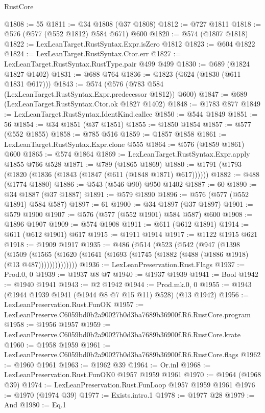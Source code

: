 \begin{lexlean}{RustCore}
\begin{coremodule}
@1808 := 55
@1811 := @34 @1808 (@37 @1808)
@1812 := @727 @1811
@1818 := @576 (@577 (@552 @1812) @584 @671) @600
@1820 := @574 (@1807 @1818)
@1822 := LexLeanTarget.RustSyntax.Expr.isZero @1812
@1823 := @604 @1822
@1824 := LexLeanTarget.RustSyntax.Ctor.err
@1827 := LexLeanTarget.RustSyntax.RustType.pair @499 @499
@1830 := @689 (@1824 @1827 @1402)
@1831 := @688 @764
@1836 := @1823 (@624 (@1830 (@611 @1831 @617)))
@1843 := @574 (@576 (@783 @584 (LexLeanTarget.RustSyntax.Expr.predecessor @1812)) @600)
@1847 := @689 (LexLeanTarget.RustSyntax.Ctor.ok @1827 @1402)
@1848 := @1783 @877
@1849 := LexLeanTarget.RustSyntax.IdentKind.callee
@1850 := @544 @1849
@1851 := 56
@1854 := @34 @1851 (@37 @1851)
@1855 := @1850 @1854
@1857 := @577 (@552 @1855)
@1858 := @785 @516
@1859 := @1857 @1858
@1861 := LexLeanTarget.RustSyntax.Expr.clone @555
@1864 := @576 (@1859 @1861) @600
@1865 := @574 @1864
@1869 := LexLeanTarget.RustSyntax.Expr.apply @1855 @766 @528
@1871 := @789 (@1865 @1869)
@1880 := @1791 (@1793 (@1820 (@1836 (@1843 (@1847 (@611 (@1848 @1871) @617))))))
@1882 := @488 (@1774 @1880)
@1886 := @543 (@546 @90) @950 @1402
@1887 := 60
@1890 := @34 @1887 (@37 @1887)
@1891 := @579 @1890
@1896 := @576 (@577 (@552 @1891) @584 @587)
@1897 := 61
@1900 := @34 @1897 (@37 @1897)
@1901 := @579 @1900
@1907 := @576 (@577 (@552 @1901) @584 @587) @600
@1908 := @1896 @1907
@1909 := @574 @1908
@1911 := @611 (@612 @1891)
@1914 := @611 (@612 @1901) @617
@1915 := @1911 @1914
@1917 := @1122 @1915 @621
@1918 := @1909 @1917
@1935 := @486
    (@514
      (@523
        (@542
          (@947
            (@1398
              (@1509
                (@1565
                  (@1620 (@1641 (@1693 (@1745 (@1882 (@488 (@1886 @1918) (@13 @487))))))))))))))
@1936 := LexLeanPreservation.Rust.Flags
@1937 := Prod.{0, 0}
@1939 := @1937 @8 @7
@1940 := @1937 @1939
@1941 := Bool
@1942 := @1940 @1941
@1943 := @2 @1942
@1944 := Prod.mk.{0, 0}
@1955 := @1943 (@1944 @1939 @1941 (@1944 @8 @7 @15 @11) @528) (@13 @1942)
@1956 := LexLeanPreservation.Rust.FunOK
@1957 := LexLeanPreserve.C6059bd0b2a90027b0d3ba7689b36900f.R6.RustCore.program
@1958 := @1956 @1957
@1959 := LexLeanPreserve.C6059bd0b2a90027b0d3ba7689b36900f.R6.RustCore.krate
@1960 := @1958 @1959
@1961 := LexLeanPreserve.C6059bd0b2a90027b0d3ba7689b36900f.R6.RustCore.flags
@1962 := @1960 @1961
@1963 := @1962 @39
@1964 := Or.inl
@1968 := LexLeanPreservation.Rust.FunOK0 @1957 @1959 @1961
@1970 := @1964 (@1968 @39)
@1974 := LexLeanPreservation.Rust.FunLoop @1957 @1959 @1961
@1976 := @1970 (@1974 @39)
@1977 := Exists.intro.{1}
@1978 := @1977 @28
@1979 := And
@1980 := Eq.{1}

\end{coremodule}
\end{lexlean}
